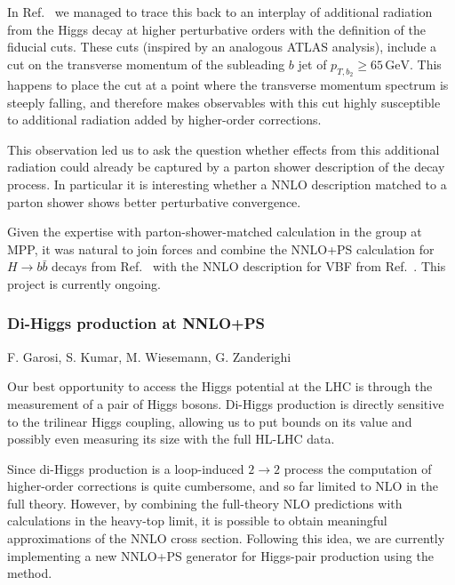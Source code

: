 \documentclass{FBR_Bericht_2025}
\begin{document}
\begin{refsection}
In Ref.~\cite{steriadis:2024nbg} we managed to trace this back to an interplay
of additional radiation from the Higgs decay at higher perturbative orders with
the definition of the fiducial cuts. These cuts (inspired by an analogous ATLAS
analysis), include a cut on the transverse momentum of the subleading $b$ jet
of $p_{T,b_2} \geq 65\,\mathrm{GeV}$. This happens to place the cut at a point
where the transverse momentum spectrum is steeply falling, and therefore makes
observables with this cut highly susceptible to additional radiation added by
higher-order corrections.

This observation led us to ask the question whether effects from this
additional radiation could already be captured by a parton shower description
of the decay process. In particular it is interesting whether a NNLO
description matched to a parton shower shows better perturbative convergence.

Given the expertise with parton-shower-matched calculation in the group at MPP,
it was natural to join forces and combine the NNLO+PS calculation for $H \to
b\bar{b}$ decays from Ref.~\cite{Bizon:2019tfo} with the NNLO description for
VBF from Ref.~\cite{Asteriadis:2021gpd}. This project is currently ongoing.


\subsubsection{Di-Higgs production at NNLO+PS}
\begin{Namen}
F. Garosi, S. Kumar, M. Wiesemann, G. Zanderighi
\end{Namen}

Our best opportunity to access the Higgs potential at the LHC is through the measurement
of a pair of Higgs bosons. Di-Higgs production is directly sensitive to the trilinear Higgs coupling,
allowing us to put bounds on its value and possibly even measuring its size with the full HL-LHC data.

Since di-Higgs production is a loop-induced $2\to 2$ process the computation of higher-order 
corrections is quite cumbersome, and so far limited to NLO in the full theory. However, by combining
the full-theory NLO predictions with calculations in the heavy-top limit, it is possible to obtain 
meaningful approximations of the NNLO cross section. Following this idea, we are currently 
implementing a new NNLO+PS generator for Higgs-pair production using the \minnlo{} method.


\printbibliography[heading=subbibliography]
\end{refsection}
\end{document}
